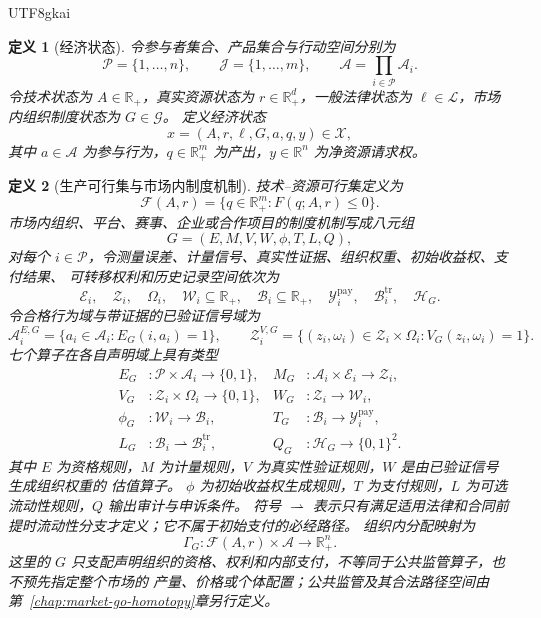\documentclass[12pt,a4paper,openany]{report}
\newtheorem{definition}{定义}[chapter]
\newcommand{\RR}{\mathbb R}
\newcommand{\Gov}{\mathcal G}
\newcommand{\Law}{\mathcal L}
\newcommand{\Feas}{\mathcal F}
\newcommand{\Part}{\mathcal P}
\newcommand{\Act}{\mathcal A}
\newcommand{\Goods}{\mathcal J}
\newcommand{\States}{\mathcal X}
\begin{document}
\begin{CJK*}{UTF8}{gkai}
\begin{definition}[经济状态]
令参与者集合、产品集合与行动空间分别为
\[
  \Part=\{1,\ldots,n\},\qquad
  \Goods=\{1,\ldots,m\},\qquad
  \Act=\prod_{i\in\Part}\Act_i.
\]
令技术状态为 \(A\in\RR_+\)，真实资源状态为 \(r\in\RR_+^d\)，一般法律状态为
\(\ell\in\Law\)，市场内组织制度状态为 \(G\in\Gov\)。
定义经济状态
\[
  x=(A,r,\ell,G,a,q,y)\in\States,
\]
其中 \(a\in\Act\) 为参与行为，\(q\in\RR_+^m\) 为产出，\(y\in\RR^n\) 为净资源请求权。
\end{definition}

\begin{definition}[生产可行集与市场内制度机制]
技术--资源可行集定义为
\[
  \Feas(A,r)
  =\{q\in\RR_+^m:F(q;A,r)\le0\}.
\]
市场内组织、平台、赛事、企业或合作项目的制度机制写成八元组
\[
  G=(E,M,V,W,\phi,T,L,Q),
\]
对每个 \(i\in\Part\)，令测量误差、计量信号、真实性证据、组织权重、初始收益权、支付结果、
可转移权利和历史记录空间依次为
\[
  \mathcal E_i,\quad \mathcal Z_i,\quad \Omega_i,
  \quad \mathcal W_i\subseteq\RR_+,
  \quad \mathcal B_i\subseteq\RR_+,
  \quad \mathcal Y_i^{\mathrm{pay}},
  \quad \mathcal B_i^{\mathrm{tr}},
  \quad \mathcal H_G.
\]
令合格行为域与带证据的已验证信号域为
\[
  \Act_i^{E,G}=\{a_i\in\Act_i:E_G(i,a_i)=1\},
  \qquad
  \mathcal Z_i^{V,G}
  =\{(z_i,\omega_i)\in\mathcal Z_i\times\Omega_i:
  V_G(z_i,\omega_i)=1\}.
\]
七个算子在各自声明域上具有类型
\[
\begin{aligned}
  E_G&:\Part\times\Act_i\longrightarrow\{0,1\},&
  M_G&:\Act_i\times\mathcal E_i\longrightarrow\mathcal Z_i,\\
  V_G&:\mathcal Z_i\times\Omega_i\longrightarrow\{0,1\},&
  W_G&:\mathcal Z_i\longrightarrow\mathcal W_i,\\
  \phi_G&:\mathcal W_i\longrightarrow\mathcal B_i,&
  T_G&:\mathcal B_i\longrightarrow\mathcal Y_i^{\mathrm{pay}},\\
  L_G&:\mathcal B_i\rightharpoonup\mathcal B_i^{\mathrm{tr}},&
  Q_G&:\mathcal H_G\longrightarrow\{0,1\}^{2}.
\end{aligned}
\]
其中 \(E\) 为资格规则，\(M\) 为计量规则，\(V\) 为真实性验证规则，\(W\) 是由已验证信号生成组织权重的
估值算子。
\(\phi\) 为初始收益权生成规则，\(T\) 为支付规则，\(L\) 为可选流动性规则，\(Q\) 输出审计与申诉条件。
符号 \(\rightharpoonup\) 表示只有满足适用法律和合同前提时流动性分支才定义；它不属于初始支付的必经路径。
组织内分配映射为
\[
  \Gamma_G:\Feas(A,r)\times\Act\longrightarrow\RR_+^n.
\]
这里的 \(G\) 只支配声明组织的资格、权利和内部支付，不等同于公共监管算子，也不预先指定整个市场的
产量、价格或个体配置；公共监管及其合法路径空间由第~\ref{chap:market-go-homotopy}章另行定义。
\end{definition}


\end{CJK*}
\end{document}
